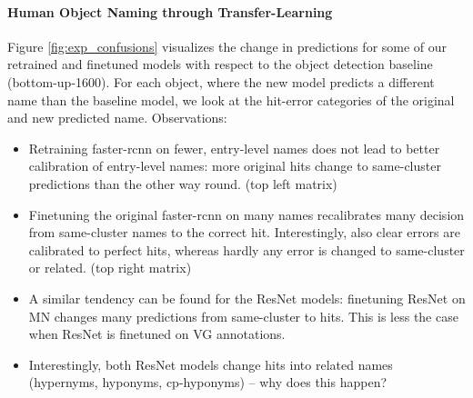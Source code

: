 \paragraph{Human Object Naming through Transfer-Learning} Figure \ref{fig:exp_confusions} visualizes the change in predictions for  some of our retrained and finetuned models with respect to the object detection baseline (bottom-up-1600). For each object, where the new model predicts a different name than the baseline model, we look at the hit-error categories of the original and new predicted name. Observations:
\begin{itemize}
	\item Retraining faster-rcnn on fewer, entry-level names does not lead to better calibration of entry-level names: more original hits change to same-cluster predictions than the other way round. (top left matrix)
	\item Finetuning the original faster-rcnn on many names recalibrates many decision from same-cluster names to the correct hit. Interestingly, also clear errors are calibrated to perfect hits, whereas hardly any error is changed to same-cluster or related.  (top right matrix)
	\item A similar tendency can be found for the ResNet models: finetuning ResNet on MN changes many predictions from same-cluster to hits. This is less the case when ResNet is finetuned on VG annotations.
	\item Interestingly, both ResNet models change hits into related names (hypernyms, hyponyms, cp-hyponyms) -- why does this happen?
\end{itemize}

